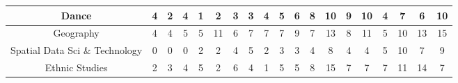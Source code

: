 \documentclass[10pt]{article}
\begin{document}
\begin{landscape}
\begin{longtable}[c]{|ccccccccccccccccccc|}
	\multicolumn{1}{|c|}{Dance}                                      & \multicolumn{1}{c|}{4}          & \multicolumn{1}{c|}{2}          & \multicolumn{1}{c|}{4}          & \multicolumn{1}{c|}{1}          & \multicolumn{1}{c|}{2}          & \multicolumn{1}{c|}{3}          & \multicolumn{1}{c|}{3}          & \multicolumn{1}{c|}{4}          & \multicolumn{1}{c|}{5}          & \multicolumn{1}{c|}{6}          & \multicolumn{1}{c|}{8}          & \multicolumn{1}{c|}{10}         & \multicolumn{1}{c|}{9}          & \multicolumn{1}{c|}{10}         & \multicolumn{1}{c|}{4}          & \multicolumn{1}{c|}{7}          & \multicolumn{1}{c|}{6}          & 10         \\ \hline
	\multicolumn{1}{|c|}{Geography}                                  & \multicolumn{1}{c|}{4}          & \multicolumn{1}{c|}{4}          & \multicolumn{1}{c|}{5}          & \multicolumn{1}{c|}{5}          & \multicolumn{1}{c|}{11}         & \multicolumn{1}{c|}{6}          & \multicolumn{1}{c|}{7}          & \multicolumn{1}{c|}{7}          & \multicolumn{1}{c|}{7}          & \multicolumn{1}{c|}{9}          & \multicolumn{1}{c|}{7}          & \multicolumn{1}{c|}{13}         & \multicolumn{1}{c|}{8}          & \multicolumn{1}{c|}{11}         & \multicolumn{1}{c|}{5}          & \multicolumn{1}{c|}{10}         & \multicolumn{1}{c|}{13}         & 15         \\ \hline
	\multicolumn{1}{|c|}{Spatial Data Sci \& Technology}             & \multicolumn{1}{c|}{0}          & \multicolumn{1}{c|}{0}          & \multicolumn{1}{c|}{0}          & \multicolumn{1}{c|}{2}          & \multicolumn{1}{c|}{2}          & \multicolumn{1}{c|}{4}          & \multicolumn{1}{c|}{5}          & \multicolumn{1}{c|}{2}          & \multicolumn{1}{c|}{3}          & \multicolumn{1}{c|}{3}          & \multicolumn{1}{c|}{4}          & \multicolumn{1}{c|}{8}          & \multicolumn{1}{c|}{4}          & \multicolumn{1}{c|}{4}          & \multicolumn{1}{c|}{5}          & \multicolumn{1}{c|}{10}         & \multicolumn{1}{c|}{7}          & 9          \\ \hline
	\multicolumn{1}{|c|}{Ethnic Studies}                             & \multicolumn{1}{c|}{2}          & \multicolumn{1}{c|}{3}          & \multicolumn{1}{c|}{4}          & \multicolumn{1}{c|}{5}          & \multicolumn{1}{c|}{2}          & \multicolumn{1}{c|}{6}          & \multicolumn{1}{c|}{4}          & \multicolumn{1}{c|}{1}          & \multicolumn{1}{c|}{5}          & \multicolumn{1}{c|}{5}          & \multicolumn{1}{c|}{8}          & \multicolumn{1}{c|}{15}         & \multicolumn{1}{c|}{7}          & \multicolumn{1}{c|}{7}          & \multicolumn{1}{c|}{7}          & \multicolumn{1}{c|}{11}         & \multicolumn{1}{c|}{14}         & 7          \\ \hline

\end{longtable}
\end{landscape}
\end{document}

